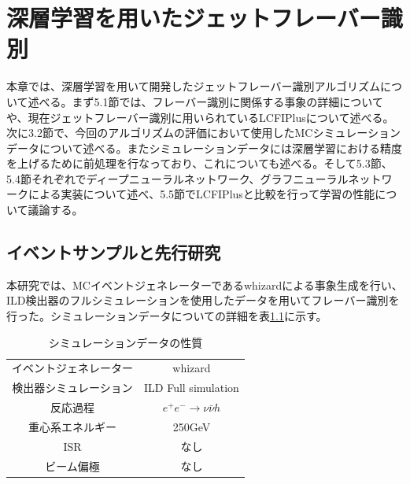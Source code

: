 


\chapter{深層学習を用いたジェットフレーバー識別} \label{sec:Flavortagging}
本章では、深層学習を用いて開発したジェットフレーバー識別アルゴリズムについて述べる。まず5.1節では、フレーバー識別に関係する事象の詳細についてや、現在ジェットフレーバー識別に用いられているLCFIPlusについて述べる。次に3.2節で、今回のアルゴリズムの評価において使用したMCシミュレーションデータについて述べる。またシミュレーションデータには深層学習における精度を上げるために前処理を行なっており、これについても述べる。そして5.3節、5.4節それぞれでディープニューラルネットワーク、グラフニューラルネットワークによる実装について述べ、5.5節でLCFIPlusと比較を行って学習の性能について議論する。
\section{イベントサンプルと先行研究}
本研究では、MCイベントジェネレーターであるwhizardによる事象生成を行い、ILD検出器のフルシミュレーションを使用したデータを用いてフレーバー識別を行った。シミュレーションデータについての詳細を表\ref{data}に示す。
\begin{table}[H]
 \centering
 \begin{tabular}{ c c }
 \hline
 イベントジェネレーター & whizard\\
 検出器シミュレーション & ILD Full simulation\\
 反応過程 & $e^+e^- \rightarrow \nu \bar{\nu} h$\\
 重心系エネルギー & 250GeV\\
 ISR & なし\\
 ビーム偏極 & なし\\
 \hline
  \end{tabular}
  \label{data}
  \caption{シミュレーションデータの性質}
\end{table}
